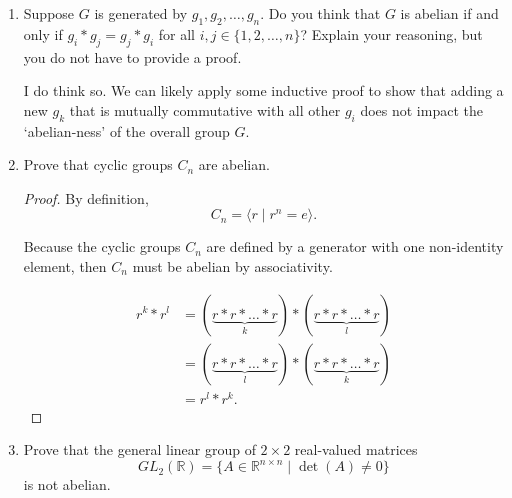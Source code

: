 \documentclass{article}
\begin{document}
\begin{enumerate}
{\begin{enumerate}
{\begin{enumerate}
{\begin{proof}
                    Therefore, \(G\) is generated by \(g_1\) and \(g_2\) then 
                    \(G\) is abelian if and only if \(g_1 * g_2 = g_2 * g_1\).
                \end{proof}
            }
        
            \item {
                Suppose \(G\) is generated by \(g_1, g_2, \dots, g_n\). Do you 
                think that \(G\) is abelian if and only if \(g_i * g_j = g_j * g_i\) 
                for all \(i, j \in \{1, 2, \dots, n\}\)? Explain your reasoning, 
                but you do not have to provide a proof.

                I do think so. We can likely apply some inductive proof to show that 
                adding a new \(g_k\) that is mutually commutative with all other 
                \(g_i\) does not impact the `abelian-ness' of the overall group 
                \(G\).
            }
        
            \item {
                Prove that cyclic groups \(C_n\) are abelian.
        
                \begin{proof}
                    By definition, 
                    \[C_n = \langle r \mid r^n = e \rangle.\]

                    Because the cyclic groups \(C_n\) are defined by a generator 
                    with one non-identity element, then \(C_n\) must be abelian
                    by associativity.

                    \begin{align}
                        r^k * r^l &= (\underbrace{r * r * \dots * r}_{k}) * (\underbrace{r * r * \dots * r}_{l} )\\
                                  &= (\underbrace{r * r * \dots * r}_{l}) * (\underbrace{r * r * \dots * r}_{k}) \\
                                  &= r^l * r^k.
                    \end{align}
                \end{proof}
            }

            \item {
                Prove that the general linear group of \(2 \times 2\) 
                real-valued matrices 
                \[GL_2(\mathbb{R}) = \{A \in \mathbb{R}^{n \times n} \mid \det(A) \neq 0\}\] 
                is not abelian.
        
}
\end{enumerate}}
\end{enumerate}}
\end{enumerate}
\end{document}
